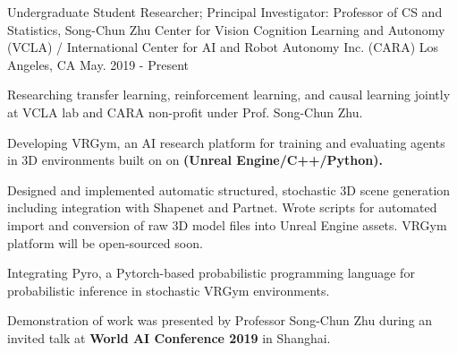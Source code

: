 

\begin{cventries}

  \cventry
    {Undergraduate Student Researcher; Principal Investigator: Professor of CS and Statistics, Song-Chun Zhu} %
    {Center for Vision Cognition Learning and Autonomy (VCLA) / \newline
    International Center for AI and Robot Autonomy Inc. (CARA)} %
    {Los Angeles, CA} %
    {May. 2019 - Present} %
    {
      \begin{cvitems} %
        \item {Researching transfer learning, reinforcement learning, and causal learning jointly at VCLA lab and CARA non-profit under Prof. Song-Chun Zhu.}
        \item {Developing VRGym, an AI research platform for training and evaluating agents in
        3D environments built on on \textbf{(Unreal Engine/C++/Python).} } 
        \item {Designed and implemented automatic structured, stochastic 3D scene generation including integration with Shapenet and Partnet. 
        Wrote scripts for automated import and conversion of raw 3D model files into Unreal Engine assets. VRGym platform will be open-sourced soon.}
        \item {Integrating Pyro, a Pytorch-based probabilistic programming language for probabilistic inference in stochastic VRGym environments.}
        \item {Demonstration of work was presented by Professor Song-Chun Zhu during an invited talk at \textbf{World AI Conference 2019} in Shanghai.}
      \end{cvitems}
    }


\end{cventries}
